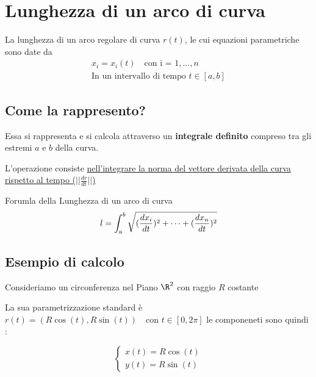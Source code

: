 \section{Lunghezza di un arco di curva}
La lunghezza di un arco regolare di curva $r(t)$, le cui equazioni parametriche sono date da 
    \begin{gather}
        x_i=x_i(t) \quad \text{con i = } 1,\dots , n \\ 
        \text{In un intervallo di tempo }t \in [a,b]
    \end{gather}
\subsection{Come la rappresento?}
Essa si rappresenta e si calcola attraverso un \textbf{integrale definito} compreso tra gli estremi $a$ e $b$ della curva.

L'operazione consiste \underline{nell'integrare la norma del vettore derivata della curva rispetto al tempo ($||\frac{dr}{dt}||$)}

\begin{definizione}{Forumla della Lunghezza di un arco di curva}
    $$ \LARGE
l = \int_{a}^{b} \sqrt{(\frac{dx_i}{dt})^2 + \dots + (\frac{dx_n}{dt})^2}
$$
\end{definizione}
\subsection{Esempio di calcolo}
Consideriamo un circonferenza nel Piano $\R^2$ con raggio $R$ costante
\begin{center}
\end{center}

La sua parametrizzazione standard è 
$
    r(t)=(R\cos(t),R\sin(t)) \quad \text{con }t \in [0,2\pi]
$ le componeneti sono quindi : 

$$
\begin{cases}
    x(t) = R\cos(t) \\ y(t)=R\sin(t)
\end{cases}
$$

